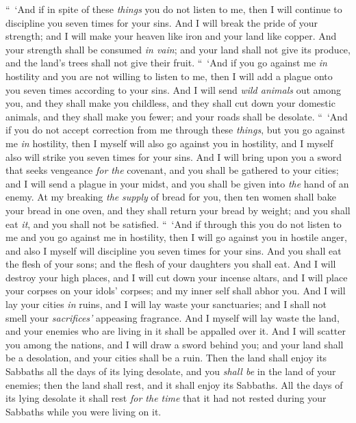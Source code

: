 \begin{biblechapter}
\verse “ ‘And if in spite of these \textit{things} you do not listen to me, then I will continue to discipline you seven times for your sins.
\verse And I will break the pride of your strength; and I will make your heaven like iron and your land like copper.
\verse And your strength shall be consumed \textit{in vain}; and your land shall not give its produce, and the land’s trees shall not give their fruit.
\verse “ ‘And if you go against me \textit{in} hostility and you are not willing to listen to me, then I will add a plague onto you seven times according to your sins.
\verse And I will send \textit{wild animals} out among you, and they shall make you childless, and they shall cut down your domestic animals, and they shall make you fewer; and your roads shall be desolate.
\verse “ ‘And if you do not accept correction from me through these \textit{things}, but you go against me \textit{in} hostility,
\verse then I myself will also go against you in hostility, and I myself also will strike you seven times for your sins.
\verse And I will bring upon you a sword that seeks vengeance \textit{for the} covenant, and you shall be gathered to your cities; and I will send a plague in your midst, and you shall be given into \textit{the} hand of an enemy.
\verse At my breaking \textit{the} \textit{supply} of bread for you, then ten women shall bake your bread in one oven, and they shall return your bread by weight; and you shall eat \textit{it}, and you shall not be satisfied.
\verse “ ‘And if through this you do not listen to me and you go against me in hostility,
\verse then I will go against you in hostile anger, and also I myself will discipline you seven times for your sins.
\verse And you shall eat the flesh of your sons; and the flesh of your daughters you shall eat.
\verse And I will destroy your high places, and I will cut down your incense altars, and I will place your corpses on your idols’ corpses; and my inner self shall abhor you.
\verse And I will lay your cities \textit{in} ruins, and I will lay waste your sanctuaries; and I shall not smell your \textit{sacrifices’} appeasing fragrance.
\verse And I myself will lay waste the land, and your enemies who are living in it shall be appalled over it.
\verse And I will scatter you among the nations, and I will draw a sword behind you; and your land shall be a desolation, and your cities shall be a ruin.
\verse Then the land shall enjoy its Sabbaths all the days of its lying desolate, and you \textit{shall be} in the land of your enemies; then the land shall rest, and it shall enjoy its Sabbaths.
\verse All the days of its lying desolate it shall rest \textit{for the time} that it had not rested during your Sabbaths while you were living on it.

\end{biblechapter}
